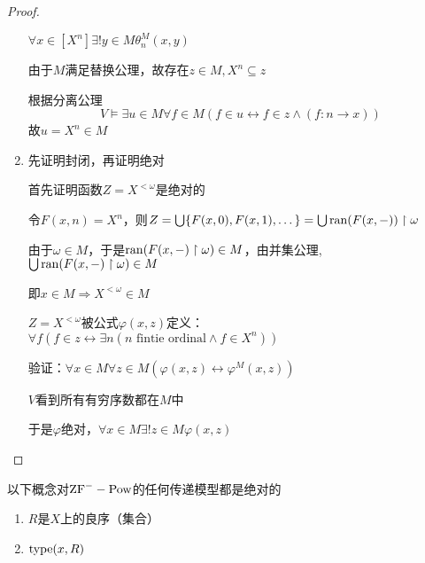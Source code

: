 \documentclass[11pt]{article}
\begin{document}
\begin{proof}
\begin{enumerate}
\(\forall x\in[X^n]\exists!y\in M\theta_n^M(x,y)\)

由于\(M\)满足替换公理，故存在\(z\in M, X^n\subseteq z\)

根据分离公理
\begin{equation*}
V\vDash\exists u\in M\forall f\in M(f\in u\leftrightarrow f\in z\wedge(f:n\to x))
\end{equation*}
故\(u=X^n\in M\)

\item 先证明封闭，再证明绝对

首先证明函数\(Z=X^{<\omega}\)是绝对的

令\(F(x,n)=X^n\)，则\(Z=\bigcup\{F(x,0),F(x,1),\dots\}=\bigcup\operatorname{ran}(F(x,-))\upharpoonright\omega\)

由于\(\omega\in M\)，于是\(\operatorname{ran}(F(x,-)\upharpoonright\omega)\in M\)，由并集公理,\(\bigcup\operatorname{ran}(F(x,-)\upharpoonright\omega)\in M\)

即\(x\in M\Rightarrow X^{<\omega}\in M\)

\(Z=X^{<\omega}\)被公式\(\varphi(x,z)\)定义：\(\forall f(f\in z\leftrightarrow\exists n(n\text{ fintie ordinal}\wedge f\in X^n))\)

验证：\(\forall x\in M\forall z\in M(\varphi(x,z)\leftrightarrow\varphi^M(x,z))\)

\(V\)看到所有有穷序数都在\(M\)中

于是\(\varphi\)绝对，\(\forall x\in M\exists!z\in M\varphi(x,z)\)
\end{enumerate}
\end{proof}

\begin{theorem}[]
以下概念对\(\text{ZF}^--\operatorname{Pow}\)的任何传递模型都是绝对的
\begin{enumerate}
\item \(R\)是\(X\)上的良序（集合）
\item \(\operatorname{type}(x,R)\)
\end{enumerate}
\end{theorem}
\end{document}
